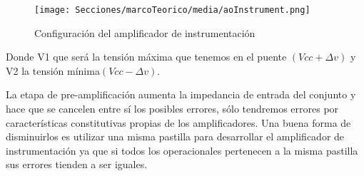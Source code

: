 \begin{figure}[H]
    \centering
    \texttt{[image: Secciones/marcoTeorico/media/aoInstrument.png]}
    \caption{Configuración del amplificador de instrumentación}
    \label{fig:aoInstrument}
\end{figure}
Donde V1 que será la tensión máxima que tenemos en el puente $(Vcc+ \Delta v)$ y V2 la tensión mínima$(Vcc- \Delta v)$.

La etapa de pre-amplificación aumenta la impedancia de entrada del conjunto y hace que se cancelen entre sí los posibles errores, sólo tendremos errores por características constitutivas propias de los amplificadores. Una buena forma de disminuirlos es utilizar una misma pastilla para desarrollar el amplificador de instrumentación ya que si todos los operacionales pertenecen a la misma pastilla sus errores tienden a ser iguales.

